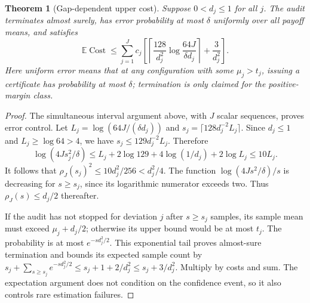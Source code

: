 \documentclass[11pt]{article}
\newtheorem{theorem}{Theorem}
\theoremstyle{remark}\newtheorem{remark}[theorem]{Remark}
\newcommand{\E}{\mathbb E}
\begin{document}
\begin{theorem}[Gap-dependent upper cost]
Suppose $0<d_j\le1$ for all $j$. The audit terminates almost surely, has error probability at most $\delta$ uniformly over all payoff means, and satisfies
\[
 \E\operatorname{Cost}\le\sum_{j=1}^J c_j
 \left[\left\lceil\frac{128}{d_j^2}
 \log\frac{64J}{\delta d_j}\right\rceil+\frac3{d_j^2}\right].
\]
Here uniform error means that at any configuration with some $\mu_j>t_j$, issuing a certificate has probability at most $\delta$; termination is only claimed for the positive-margin class.
\end{theorem}
\begin{proof}
The simultaneous interval argument above, with $J$ scalar sequences, proves error control. Let $L_j=\log(64J/(\delta d_j))$ and $s_j=\lceil128d_j^{-2}L_j\rceil$. Since $d_j\le1$ and $L_j\ge\log64>4$, we have $s_j\le129d_j^{-2}L_j$. Therefore
\[
 \log(4Js_j^2/\delta)
 \le L_j+2\log129+4\log(1/d_j)+2\log L_j
 \le10L_j.
\]
It follows that $\rho_J(s_j)^2\le10d_j^2/256<d_j^2/4$. The function $\log(4Js^2/\delta)/s$ is decreasing for $s\ge s_j$, since its logarithmic numerator exceeds two. Thus $\rho_J(s)\le d_j/2$ thereafter.

If the audit has not stopped for deviation $j$ after $s\ge s_j$ samples, its sample mean must exceed $\mu_j+d_j/2$; otherwise its upper bound would be at most $t_j$. The probability is at most $e^{-sd_j^2/2}$. This exponential tail proves almost-sure termination and bounds its expected sample count by
$s_j+\sum_{s\ge s_j}e^{-sd_j^2/2}\le s_j+1+2/d_j^2\le s_j+3/d_j^2$.
Multiply by costs and sum. The expectation argument does not condition on the confidence event, so it also controls rare estimation failures.
\end{proof}
\end{document}
